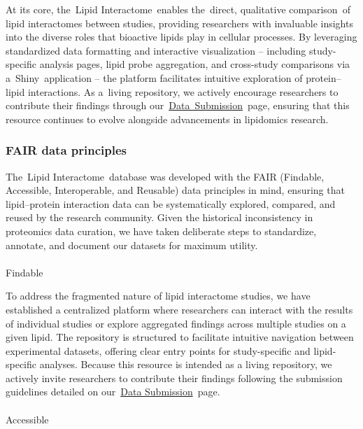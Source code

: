 \documentclass[
  letterpaper,
  DIV=11,
  numbers=noendperiod]{scrartcl}
\makeatletter
\let\oldparagraph\paragraph
\renewcommand{\paragraph}{
    \@ifstar
      \xxxParagraphStar
      \xxxParagraphNoStar
  }
\newcommand{\xxxParagraphStar}[1]{\oldparagraph*{#1}\mbox{}}
\newcommand{\xxxParagraphNoStar}[1]{\oldparagraph{#1}\mbox{}}
\makeatother
\begin{document}
At its core, the~Lipid Interactome~enables the~direct, qualitative
comparison~of lipid interactomes between studies, providing researchers
with invaluable insights into the diverse roles that bioactive lipids
play in cellular processes. By leveraging standardized data formatting
and interactive visualization -- including study-specific analysis
pages, lipid probe aggregation, and cross-study comparisons via
a~Shiny~application -- the platform facilitates intuitive exploration of
protein--lipid interactions. As a~living repository, we actively
encourage researchers to contribute their findings through
our~\href{https://lipidinteractome.org/contactus/datasubmission}{Data~Submission}~page,
ensuring that this resource continues to evolve alongside advancements
in lipidomics research.

\subsubsection{FAIR data principles}\label{fair-data-principles}

The~Lipid Interactome~database was developed with the FAIR (Findable,
Accessible, Interoperable, and Reusable) data principles in mind,
ensuring that lipid--protein interaction data can be systematically
explored, compared, and reused by the research community. Given the
historical inconsistency in proteomics data curation, we have taken
deliberate steps to standardize, annotate, and document our datasets for
maximum utility.

\paragraph{Findable}\label{findable}

To address the fragmented nature of lipid interactome studies, we have
established a centralized platform where researchers can interact with
the results of individual studies or explore aggregated findings across
multiple studies on a given lipid. The repository is structured to
facilitate intuitive navigation between experimental datasets, offering
clear entry points for study-specific and lipid-specific analyses.
Because this resource is intended as a living repository, we actively
invite researchers to contribute their findings following the submission
guidelines detailed on
our~\href{https://lipidinteractome.org/contactus/datasubmission}{Data
Submission}~page.

\paragraph{Accessible}\label{accessible}
\end{document}
